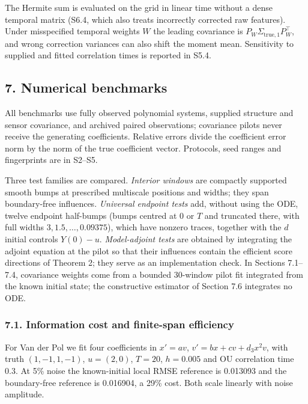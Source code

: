 \documentclass[
  american,
  11pt,
]{article}
\begin{document}
The Hermite sum is evaluated on the grid in linear time without a dense
temporal matrix (S6.4, which also treats incorrectly corrected raw
features). Under misspecified temporal weights \(W\) the leading
covariance is \(P_W\Sigma_{\mathrm{true},1}P_W^\top\), and wrong
correction variances can also shift the moment mean. Sensitivity to
supplied and fitted correlation times is reported in S5.4.

\subsection{7. Numerical benchmarks}\label{numerical-benchmarks}

All benchmarks use fully observed polynomial systems, supplied structure
and sensor covariance, and archived paired observations; covariance
pilots never receive the generating coefficients. Relative errors divide
the coefficient error norm by the norm of the true coefficient vector.
Protocols, seed ranges and fingerprints are in S2--S5.

Three test families are compared. \emph{Interior windows} are compactly
supported smooth bumps at prescribed multiscale positions and widths;
they span boundary-free influences. \emph{Universal endpoint tests} add,
without using the ODE, twelve endpoint half-bumps (bumps centred at
\(0\) or \(T\) and truncated there, with full widths
\(3,1.5,\ldots,0.09375\)), which have nonzero traces, together with the
\(d\) initial controls \(Y(0)-u\). \emph{Model-adjoint tests} are
obtained by integrating the adjoint equation at the pilot so that their
influences contain the efficient score directions of Theorem 2; they
serve as an implementation check. In Sections 7.1--7.4, covariance
weights come from a bounded 30-window pilot fit integrated from the
known initial state; the constructive estimator of Section 7.6
integrates no ODE.

\subsubsection{7.1. Information cost and finite-span
efficiency}\label{information-cost-and-finite-span-efficiency}

For Van der Pol we fit four coefficients in \(x'=a v\),
\(v'=b x+c v+d_3x^2v\), with truth \((1,-1,1,-1)\), \(u=(2,0)\),
\(T=20\), \(h=0.005\) and OU correlation time 0.3. At 5\% noise the
known-initial local RMSE reference is 0.013093 and the boundary-free
reference is 0.016904, a 29\% cost. Both scale linearly with noise
amplitude.
\end{document}
